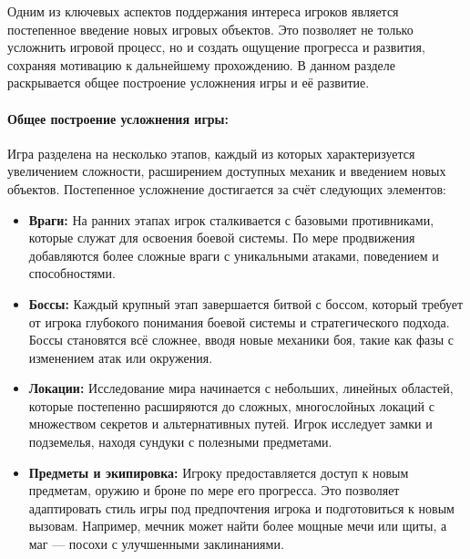 \documentclass{article}
\begin{document}
Одним из ключевых аспектов поддержания интереса игроков является постепенное введение новых игровых объектов. Это позволяет не только усложнить игровой процесс, но и создать ощущение прогресса и развития, сохраняя мотивацию к дальнейшему прохождению. В данном разделе раскрывается общее построение усложнения игры и её развитие.

\paragraph{Общее построение усложнения игры:}
Игра разделена на несколько этапов, каждый из которых характеризуется увеличением сложности, расширением доступных механик и введением новых объектов. Постепенное усложнение достигается за счёт следующих элементов:
\begin{itemize}
    \item \textbf{Враги:} На ранних этапах игрок сталкивается с базовыми противниками, которые служат для освоения боевой системы. По мере продвижения добавляются более сложные враги с уникальными атаками, поведением и способностями.
    \item \textbf{Боссы:} Каждый крупный этап завершается битвой с боссом, который требует от игрока глубокого понимания боевой системы и стратегического подхода. Боссы становятся всё сложнее, вводя новые механики боя, такие как фазы с изменением атак или окружения.
    \item \textbf{Локации:} Исследование мира начинается с небольших, линейных областей, которые постепенно расширяются до сложных, многослойных локаций с множеством секретов и альтернативных путей. Игрок исследует замки и подземелья, находя сундуки с полезными предметами.
    \item \textbf{Предметы и экипировка:} Игроку предоставляется доступ к новым предметам, оружию и броне по мере его прогресса. Это позволяет адаптировать стиль игры под предпочтения игрока и подготовиться к новым вызовам. Например, мечник может найти более мощные мечи или щиты, а маг — посохи с улучшенными заклинаниями.
\end{itemize}
\end{document}
